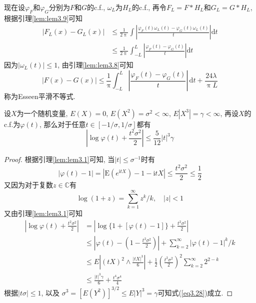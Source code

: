 \documentclass[cn, 12pt, math=mtpro2, bibstyle=apa, blue, twocol]{elegantbook}
\begin{document}
现在设$\varphi_F$和$\varphi_G$分别为$F$和$G$的c.f., $\omega_L$为$H_L$的c.f., 再令$F_L=F\ast H_L$和$G_L=G\ast H_L$, 根据引理\ref{lem:lem3.9}可知
\begin{align*}
|F_L(x)-G_L(x)|&\leq\frac{1}{2\uppi}\int\left|\frac{\varphi_F(t)\omega_L(t)-\varphi_G(t)\omega_L(t)}{t}\right|\text{d}t \\
&\leq\frac{1}{2\uppi}\int_{-L}^{L}\left|\frac{\varphi_F(t)-\varphi_G(t)}{t}\right|\text{d}t
\end{align*}
因为$|\omega_L(t)|\leq 1$, 由引理\ref{lem:lem3.8}可知
\begin{equation}\label{eq3.26}
  |F(x)-G(x)|\leq\frac{1}{\uppi}\int_{-L}^{L}\left|\frac{\varphi_F(t)-\varphi_G(t)}{t}\right|\,\text{d}t+\frac{24\lambda}{\uppi L}
\end{equation}
称为Esseen平滑不等式.

\begin{lemma}\label{lem:lem3.10}
设$X$为一个随机变量, $E(X)=0$, $E(X^2)=\sigma^2<\infty$, $E|X^3|=\gamma<\infty$, 再设$X$的c.f.为$\varphi(t)$, 那么对于任意$t\in [-1/\sigma,1/\sigma]$都有
\begin{equation}\label{eq3.28}
  \left|\log\varphi(t)+\frac{t^2\sigma^2}{2}\right|\leq \frac{5}{12}|t|^3\gamma
\end{equation}
\end{lemma}
\begin{proof}
  根据引理\ref{lem:lem3.1}可知, 当$|t|\leq\sigma^{-1}$时有
  \begin{equation}\label{eq3.30}
    |\varphi(t)-1|=|\text{E}(e^{\text{i}tX})-1-\text{i}tX|\leq \frac{t^2\sigma^2}{2}\leq\frac{1}{2}
  \end{equation}
  又因为对于复数$z\in\mathbb{C}$有
  $$\log(1+z)=\sum_{k=1}^{\infty}z^k/k,\quad |z|<1$$
  又由引理\ref{lem:lem3.1}可知
  \begin{align*}
  \left|\log\varphi(t)+\frac{t^2\sigma^2}{2}\right|&=\left|\log\{1+[\varphi(t)-1]\}+\frac{t^2\sigma^2}{2}\right| \\
  &\leq \left|\varphi(t)-\left(1-\frac{t^2\sigma^2}{2}\right)\right|+\sum_{k=2}^{\infty}|\varphi(t)-1|^k/k \\
  &\leq E\left|(tX)^2\wedge \frac{|tX|^3}{6}\right|+\frac{1}{2}\left(\frac{t^2\sigma^2}{2}\right)^2\sum_{k=2}^{\infty}2^{2-k} \\
  &\leq \frac{|t|^3\gamma}{6}+\frac{t^4\sigma^4}{4}
  \end{align*}
  根据$|t\sigma|\leq 1$, 以及
  $\sigma^3=[E(Y^2)]^{3/2}\leq E|Y|^3=\gamma$可知式(\ref{eq3.28})成立.
\end{proof}
\end{document}
